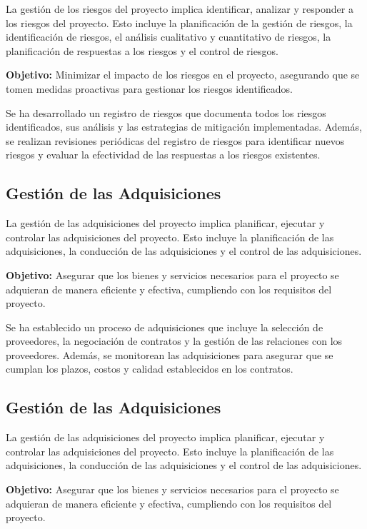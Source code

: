     La gestión de los riesgos del proyecto implica identificar, analizar y responder a los riesgos del proyecto. Esto incluye la planificación de la gestión de riesgos, la identificación de riesgos, el análisis cualitativo y cuantitativo de riesgos, la planificación de respuestas a los riesgos y el control de riesgos.

    \textbf{Objetivo:} Minimizar el impacto de los riesgos en el proyecto, asegurando que se tomen medidas proactivas para gestionar los riesgos identificados.

    Se ha desarrollado un registro de riesgos que documenta todos los riesgos identificados, sus análisis y las estrategias de mitigación implementadas. Además, se realizan revisiones periódicas del registro de riesgos para identificar nuevos riesgos y evaluar la efectividad de las respuestas a los riesgos existentes.

    \subsection{Gestión de las Adquisiciones}

    La gestión de las adquisiciones del proyecto implica planificar, ejecutar y controlar las adquisiciones del proyecto. Esto incluye la planificación de las adquisiciones, la conducción de las adquisiciones y el control de las adquisiciones.

    \textbf{Objetivo:} Asegurar que los bienes y servicios necesarios para el proyecto se adquieran de manera eficiente y efectiva, cumpliendo con los requisitos del proyecto.

    Se ha establecido un proceso de adquisiciones que incluye la selección de proveedores, la negociación de contratos y la gestión de las relaciones con los proveedores. Además, se monitorean las adquisiciones para asegurar que se cumplan los plazos, costos y calidad establecidos en los contratos.

    \subsection{Gestión de las Adquisiciones}

    La gestión de las adquisiciones del proyecto implica planificar, ejecutar y controlar las adquisiciones del proyecto. Esto incluye la planificación de las adquisiciones, la conducción de las adquisiciones y el control de las adquisiciones.

    \textbf{Objetivo:} Asegurar que los bienes y servicios necesarios para el proyecto se adquieran de manera eficiente y efectiva, cumpliendo con los requisitos del proyecto.

